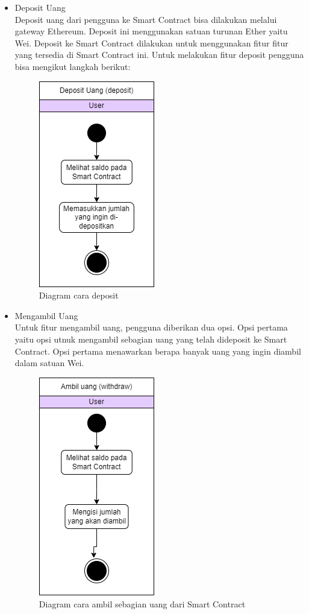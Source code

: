 \begin{itemize}

\item{Deposit Uang}
	\\Deposit uang dari pengguna ke Smart Contract bisa dilakukan melalui gateway Ethereum. Deposit ini menggunakan satuan turunan Ether yaitu Wei. Deposit ke Smart Contract dilakukan untuk menggunakan fitur fitur yang tersedia di Smart Contract ini. Untuk melakukan fitur deposit pengguna bisa mengikut langkah berikut:
\begin{figure}[htp]
	\centering
	\includegraphics[scale=0.6]{gambar/deposit-diagram.png}
	\caption{Diagram cara deposit}
	\label{fig:diagramdeposit}
\end{figure}

\item{Mengambil Uang}
	\\Untuk fitur mengambil uang, pengguna diberikan dua opsi. Opsi pertama yaitu opsi utnuk mengambil sebagian uang yang telah dideposit ke Smart Contract. Opsi pertama menawarkan berapa banyak uang yang ingin diambil dalam satuan Wei.

\begin{figure}[htp]
	\centering
	\includegraphics[scale=0.5]{gambar/withdraw-diagram.png}
	\caption{Diagram cara ambil sebagian uang dari Smart Contract}
	\label{fig:diagramwithdraw}
\end{figure}


\end{itemize}
